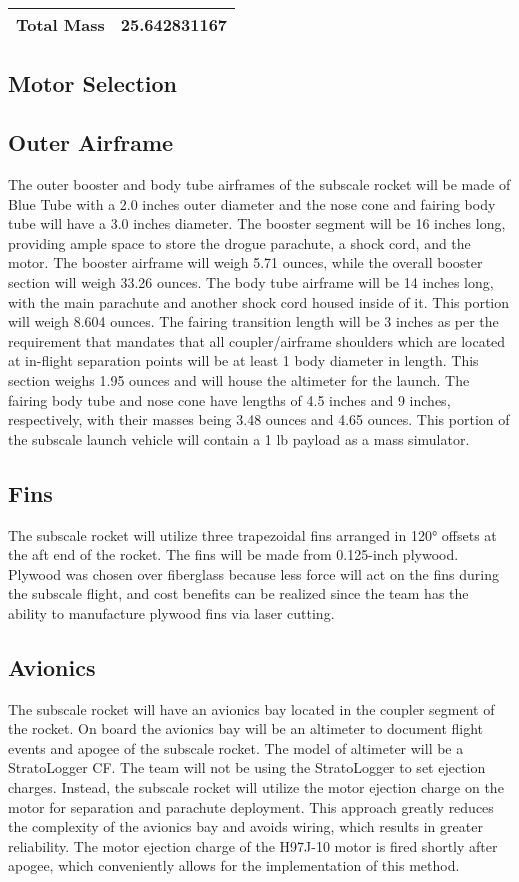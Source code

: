 \begin{tabularx}{0.8\linewidth}{X l}
Total Mass & 25.642831167 \\ \hline

\hline
\end{tabularx}

    \subsection{Motor Selection}
    
    
    \subsection{Outer Airframe}
The outer booster and body tube airframes of the subscale rocket will be made of Blue Tube with a 2.0 inches outer diameter and the nose cone and fairing body tube will have a 3.0 inches diameter. The booster segment will be 16 inches long, providing ample space to store the drogue parachute, a shock cord, and the motor. The booster airframe will weigh 5.71 ounces, while the overall booster section will weigh 33.26 ounces. The body tube airframe will be 14 inches long, with the main parachute and another shock cord housed inside of it. This portion will weigh 8.604 ounces. The fairing transition length will be 3 inches as per the requirement that mandates that all coupler/airframe shoulders which are located at in-flight separation points will be at least 1 body diameter in length. This section weighs 1.95 ounces and will house the altimeter for the launch. The fairing body tube and nose cone have lengths of 4.5 inches and 9 inches, respectively, with their masses being 3.48 ounces and 4.65 ounces. This portion of the subscale launch vehicle will contain a 1 lb payload as a mass simulator.

    \subsection{Fins}
The subscale rocket will utilize three trapezoidal fins arranged in 120° offsets at the aft end of the rocket. The fins will be made from 0.125-inch plywood. Plywood was chosen over fiberglass because less force will act on the fins during the subscale flight, and cost benefits can be realized since the team has the ability to manufacture plywood fins via laser cutting.

    \subsection{Avionics}
The subscale rocket will have an avionics bay located in the coupler segment of the rocket. On board the avionics bay will be an altimeter to document flight events and apogee of the subscale rocket. The model of altimeter will be a StratoLogger CF.
The team will not be using the StratoLogger to set ejection charges. Instead, the subscale rocket will utilize the motor ejection charge on the motor for separation and parachute deployment. This approach greatly reduces the complexity of the avionics bay and avoids wiring, which results in greater reliability. The motor ejection charge of the H97J-10 motor is fired shortly after apogee, which conveniently allows for the implementation of this method.

